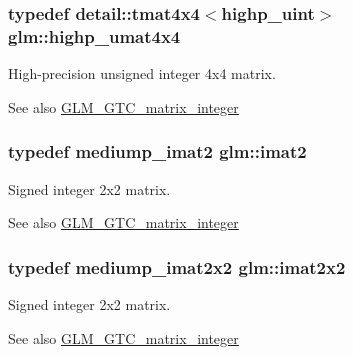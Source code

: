 \subsubsection[{highp\+\_\+umat4x4}]{\setlength{\rightskip}{0pt plus 5cm}typedef detail\+::tmat4x4$<$highp\+\_\+uint$>$ {\bf glm\+::highp\+\_\+umat4x4}}\label{group__gtc__matrix__integer_ga8600f9e6e566b3dee70de37dafd2bd8c}
High-\/precision unsigned integer 4x4 matrix. \begin{DoxySeeAlso}{See also}
\hyperlink{group__gtc__matrix__integer}{G\+L\+M\+\_\+\+G\+T\+C\+\_\+matrix\+\_\+integer} 
\end{DoxySeeAlso}
\hypertarget{group__gtc__matrix__integer_ga77a581b3366fb63fc72f8f20830003e0}{}
\subsubsection[{imat2}]{\setlength{\rightskip}{0pt plus 5cm}typedef mediump\+\_\+imat2 {\bf glm\+::imat2}}\label{group__gtc__matrix__integer_ga77a581b3366fb63fc72f8f20830003e0}
Signed integer 2x2 matrix. \begin{DoxySeeAlso}{See also}
\hyperlink{group__gtc__matrix__integer}{G\+L\+M\+\_\+\+G\+T\+C\+\_\+matrix\+\_\+integer} 
\end{DoxySeeAlso}
\hypertarget{group__gtc__matrix__integer_gaf7f44f44d966377666d41ed059524732}{}
\subsubsection[{imat2x2}]{\setlength{\rightskip}{0pt plus 5cm}typedef mediump\+\_\+imat2x2 {\bf glm\+::imat2x2}}\label{group__gtc__matrix__integer_gaf7f44f44d966377666d41ed059524732}
Signed integer 2x2 matrix. \begin{DoxySeeAlso}{See also}
\hyperlink{group__gtc__matrix__integer}{G\+L\+M\+\_\+\+G\+T\+C\+\_\+matrix\+\_\+integer} 
\end{DoxySeeAlso}
\hypertarget{group__gtc__matrix__integer_ga143bc5177bac9991d84b70da03952516}{}
